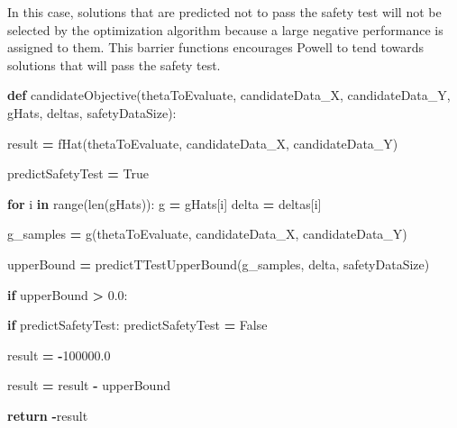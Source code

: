 \documentclass[12pt, twoside]{amherstthesis}
\newenvironment{Shaded}{\begin{snugshade}}{\end{snugshade}}
\newcommand{\BuiltInTok}[1]{#1}
\newcommand{\ControlFlowTok}[1]{\textcolor[rgb]{0.13,0.29,0.53}{\textbf{#1}}}
\newcommand{\FloatTok}[1]{\textcolor[rgb]{0.00,0.00,0.81}{#1}}
\newcommand{\KeywordTok}[1]{\textcolor[rgb]{0.13,0.29,0.53}{\textbf{#1}}}
\newcommand{\NormalTok}[1]{#1}
\newcommand{\OperatorTok}[1]{\textcolor[rgb]{0.81,0.36,0.00}{\textbf{#1}}}
\newcommand{\VariableTok}[1]{\textcolor[rgb]{0.00,0.00,0.00}{#1}}
\begin{document}
\noindent In this case, solutions that are predicted not to pass the safety test will not be selected by the optimization algorithm because a large negative performance is assigned to them. This barrier functions encourages Powell to tend towards solutions that will pass the safety test.
\begin{Shaded}
\begin{Highlighting}[]
\KeywordTok{def}\NormalTok{ candidateObjective(thetaToEvaluate, candidateData\_X, candidateData\_Y, gHats, }
\NormalTok{deltas, safetyDataSize): }

\NormalTok{    result }\OperatorTok{=}\NormalTok{ fHat(thetaToEvaluate, candidateData\_X, candidateData\_Y)}

\NormalTok{    predictSafetyTest }\OperatorTok{=} \VariableTok{True}     
    
    \ControlFlowTok{for}\NormalTok{ i }\KeywordTok{in} \BuiltInTok{range}\NormalTok{(}\BuiltInTok{len}\NormalTok{(gHats)):  }
\NormalTok{        g         }\OperatorTok{=}\NormalTok{ gHats[i]       }
\NormalTok{        delta     }\OperatorTok{=}\NormalTok{ deltas[i]      }

\NormalTok{        g\_samples }\OperatorTok{=}\NormalTok{ g(thetaToEvaluate, candidateData\_X, candidateData\_Y)}

\NormalTok{        upperBound }\OperatorTok{=}\NormalTok{ predictTTestUpperBound(g\_samples, delta, safetyDataSize)}

        \ControlFlowTok{if}\NormalTok{ upperBound }\OperatorTok{\textgreater{}} \FloatTok{0.0}\NormalTok{:}

            \ControlFlowTok{if}\NormalTok{ predictSafetyTest:}
\NormalTok{                predictSafetyTest }\OperatorTok{=} \VariableTok{False}  

\NormalTok{                result }\OperatorTok{=} \OperatorTok{{-}}\FloatTok{100000.0}    

\NormalTok{            result }\OperatorTok{=}\NormalTok{ result }\OperatorTok{{-}}\NormalTok{ upperBound}

    \ControlFlowTok{return} \OperatorTok{{-}}\NormalTok{result  }
\end{Highlighting}
\end{Shaded}
\end{document}
